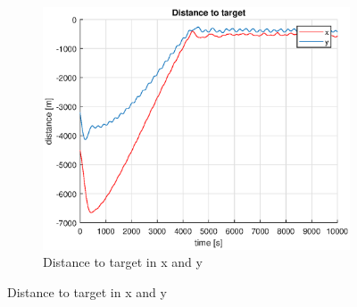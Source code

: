 \begin{figure}[ht]
	~
	\begin{subfigure}[b]{0.3\textwidth}
		\includegraphics[width=\textwidth]{x_y_distance_to_target2_7}
		\caption{Distance to target in x and y}
		\label{fig:x_y_distance_to_target2_7}
	\end{subfigure}
	\label{fig:task2_7}
\end{figure}
